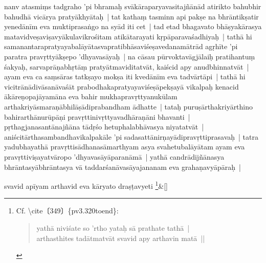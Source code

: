 \documentclass[article,a4paper]{memoir}
\newcommand{\persName}[1]{#1}
\begin{document}
	  \pstart nanv atasmiṃs tadgraho 'pi bhramaḥ svā\-\label{capv-np-10a-end}\label{capv-np-10b-start}kā\-raparyavasitajñā\-nā\-d atirikto bahubhir bahudhā\- vicā\-rya pratyā\-khyā\-taḥ | tat kathaṃ tasminn api pakṣe na bhrā\-ntikṣatir yenedā\-nī\-m eva muktiprasaṅgo na syā\-d iti cet | tad etad bhagavato \persName{bhā\-ṣyakā\-rasya} matavidveṣaviṣavyā\-kulavikrośitam atikā\-tarayati kṛpā\-paravaśadhiyaḥ | tathā\- hi samanantarapratyayabalā\-yā\-tasvapratibhā\-saviśeṣavedanamā\-trā\-d agṛhī\-te 'pi paratra pravṛttyā\-kṣepo 'dhyavasā\-yaḥ | na cā\-sau pū\-rvoktavā\-gjā\-laiḥ pratihantuṃ śakyaḥ, sarvaprā\-ṇabhṛtā\-ṃ pratyā\-tmaviditatvā\-t, kaiścid apy anudbhinnatvā\-t | ayam eva ca saṃsā\-ras tatkṣayo mokṣa iti kvedā\-nī\-m eva tadvā\-rtā\-pi | tathā\- hi vicitrā\-nā\-divā\-sanā\-vaśā\-t prabodhakapratyayaviśeṣā\-pekṣayā\- vikalpaḥ kenacid ā\-kā\-reṇopajā\-yamā\-na eva bahir mukhapravṛttyanukū\-lam arthakriyā\-smaraṇā\-bhilā\-ṣā\-diprabandham ā\-dhatte | tataḥ puruṣā\-rthakriyā\-rthino bahirarthā\-nurū\-pā\-ṇi pravṛttinivṛttyavadhā\-raṇā\-ni bhavanti | pṛthagjanasantā\-najñā\-na tā\-dṛśo hetuphalabhā\-vasya niyatatvā\-t | aniścitā\-rthasambandhavikalpakā\-le 'pi sada\label{capv-np-10b-end}sattā\-nirṇayā\-dipravṛttiprasavaḥ | tatra yadubhayathā\- pravṛttisā\-dhanasā\-marthyam asya svahetubalā\-yā\-tam ayam eva pravṛttiviṣayatvā\-ropo 'dhyavasā\-yā\-paranā\-mā\- | yathā\- candrā\-dijñā\-nasya bhrā\-ntasyā\-bhrā\-ntasya vā\- taddarśanā\-vasā\-yajananam eva grahaṇavyā\-pā\-raḥ |
	\pend
      
	    
	    \stanza[\smallbreak]
svavid apī\-yam arthavid eva kā\-ryato draṣṭavyeti \footnote{Cf. \textbackslash cite〔349〕\{pv3.320toend\}: 
	    \begin{verse}
	  yathā\- niviśate so 'rtho yataḥ sā\- prathate tathā\- |\\
	    arthasthites tadā\-tmatvā\-t svavid apy arthavin matā\- ||\\
	    
	    \end{verse}
	  }\&[\smallbreak]


	
\end{document}
